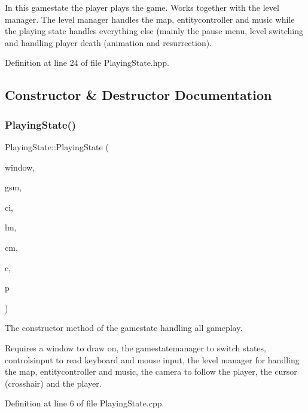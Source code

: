In this gamestate the player plays the game. Works together with the level manager. The level manager handles the map, entitycontroller and music while the playing state handles everything else (mainly the pause menu, level switching and handling player death (animation and resurrection). 

Definition at line 24 of file Playing\+State.\+hpp.



\subsection{Constructor \& Destructor Documentation}
\mbox{\label{class_playing_state_a81610cb256b5a4394200cef8aba82ade}} 
\subsubsection{\texorpdfstring{Playing\+State()}{PlayingState()}}
{\footnotesize\ttfamily Playing\+State\+::\+Playing\+State (\begin{DoxyParamCaption}\item[{sf\+::\+Render\+Window \&}]{window,  }\item[{\hyperlink{class_game_state_manager}{Game\+State\+Manager} \&}]{gsm,  }\item[{\hyperlink{struct_controls_input}{Controls\+Input} \&}]{ci,  }\item[{\hyperlink{class_level_manager}{Level\+Manager} \&}]{lm,  }\item[{\hyperlink{class_camera}{Camera} \&}]{cm,  }\item[{\hyperlink{class_cursor}{Cursor} \&}]{c,  }\item[{\hyperlink{class_player}{Player} \&}]{p }\end{DoxyParamCaption})}



The constructor method of the gamestate handling all gameplay. 

Requires a window to draw on, the gamestatemanager to switch states, controlsinput to read keyboard and mouse input, the level manager for handling the map, entitycontroller and music, the camera to follow the player, the cursor (crosshair) and the player. 

Definition at line 6 of file Playing\+State.\+cpp.



